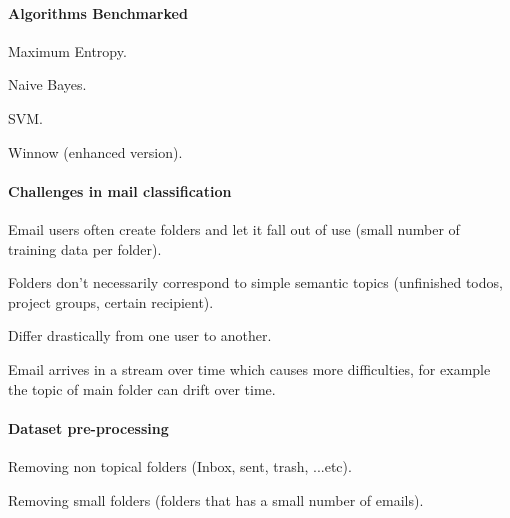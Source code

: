 \documentclass[12pt]{article}
\newenvironment{my_itemize}
{\begin{itemize}
  \setlength{\itemsep}{0cm}
  \setlength{\parskip}{0cm}}
{\end{itemize}}
\begin{document}
\paragraph{Algorithms Benchmarked}
\begin{my_itemize}
  \item Maximum Entropy.
  \item Naive Bayes.
  \item SVM.
  \item Winnow (enhanced version).
\end{my_itemize}

\paragraph{Challenges in mail classification}
\begin{my_itemize}
  \item Email users often create folders and let it fall out of use 
	(small number of training data per folder).
  \item Folders don’t necessarily correspond to simple semantic topics 
	(unfinished todos, project groups, certain recipient).
  \item Differ drastically from one user to another.
  \item Email arrives in a stream over time which causes more difficulties, 
	for example the topic of main folder can drift over time.
\end{my_itemize}


\paragraph{Dataset pre-processing}
\begin{my_itemize}
    \item Removing non topical folders (Inbox, sent, trash, ...etc).
    \item Removing small folders (folders that has a small number of emails).
\end{my_itemize}
\end{document}
